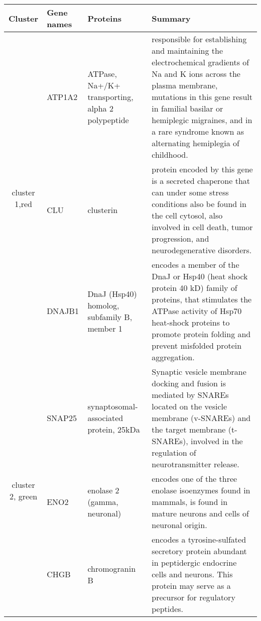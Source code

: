 \begin{table}[htdp]
\begin{center}
\begin{tabular}{|c|p{0.5in}|p{1.4in}|p{3.6in}|} 
\hline
Cluster & Gene names & Proteins  & Summary \\
\hline
 \multirow{3}{4em}{\small{cluster 1,red}}  &  \small{ATP1A2} & \footnotesize{ ATPase, Na+/K+ transporting, alpha 2 polypeptide} & \scriptsize{responsible for establishing and maintaining the electrochemical gradients of Na and K ions across the plasma membrane, mutations in this gene result in familial basilar or hemiplegic migraines, and in a rare syndrome known as alternating hemiplegia of childhood.}   \\ 
 					      & \small{CLU} &  \footnotesize{clusterin} & \scriptsize{protein encoded by this gene is a secreted chaperone that can under some stress conditions also be found in the cell cytosol, also involved in cell death, tumor progression, and neurodegenerative disorders.} \\
					      & \small{DNAJB1} & \footnotesize{DnaJ (Hsp40) homolog, subfamily B, member 1} & \scriptsize{encodes a member of the DnaJ or Hsp40 (heat shock protein 40 kD) family of proteins, that stimulates the ATPase activity of Hsp70 heat-shock proteins  to promote protein folding and prevent misfolded protein aggregation.} \\
\hline
 \multirow{3}{4em}{\small{cluster 2, green}} & \small{SNAP25} & \footnotesize{synaptosomal-associated protein, 25kDa} & \scriptsize{Synaptic vesicle membrane docking and fusion is mediated by SNAREs located on the vesicle membrane (v-SNAREs) and the target membrane (t-SNAREs), involved in the regulation of neurotransmitter release.}\\
 					    & \small{ENO2} & \footnotesize{enolase 2 (gamma, neuronal)} & \scriptsize{ encodes one of the three enolase isoenzymes found in mammals, is found in mature neurons and cells of neuronal origin.} \\
					    &  \small{CHGB} &  \footnotesize{chromogranin B} & \scriptsize{ encodes a tyrosine-sulfated secretory protein abundant in peptidergic endocrine cells and neurons. This protein may serve as a precursor for regulatory peptides.} \\
 \hline
 

\end{tabular}
\end{center}
\end{table}
